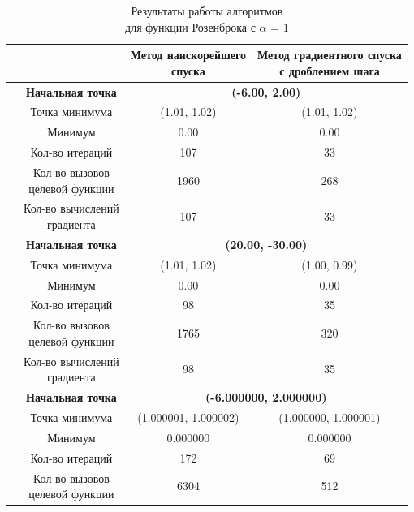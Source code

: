 \begin{table}[H]
        \centering
        \vspace*{-1.5em}
        \caption{Результаты работы алгоритмов\\для функции Розенброка с $\alpha$ = 1}
        \footnotesize
        \begin{tabular}{|c|c|c|c|}
        \hline
        & &\makecell{Метод наискорейшего\\спуска} &\makecell{Метод градиентного спуска\\с дроблением шага} \\
        \hline
	\multirow{10}{*}{\rotatebox[origin=c]{90}{$\varepsilon = 0.01$}}&\textbf{Начальная точка} &\multicolumn{2}{c|}{\textbf{(-6.00, 2.00)}}\\
	\cline{2-4}
	&Точка минимума &(1.01, 1.02) &(1.01, 1.02) \\ 
	\cline{2-4}
	&Минимум &0.00 &0.00 \\ 
	\cline{2-4}
	&Кол-во итераций &107 &33 \\ 
	\cline{2-4}
	&\makecell{Кол-во вызовов\\целевой функции} &1960 &268 \\ 
	\cline{2-4}
	&\makecell{Кол-во вычислений\\градиента} &107 &33 \\ 
	\cline{2-4}
\cline{2-4}&\textbf{Начальная точка} &\multicolumn{2}{c|}{\textbf{(20.00, -30.00)}}\\
	\cline{2-4}
	&Точка минимума &(1.01, 1.02) &(1.00, 0.99) \\ 
	\cline{2-4}
	&Минимум &0.00 &0.00 \\ 
	\cline{2-4}
	&Кол-во итераций &98 &35 \\ 
	\cline{2-4}
	&\makecell{Кол-во вызовов\\целевой функции} &1765 &320 \\ 
	\cline{2-4}
	&\makecell{Кол-во вычислений\\градиента} &98 &35 \\ 
	\cline{2-4}
	\hline
	\multirow{10}{*}{\rotatebox[origin=c]{90}{$\varepsilon = 1e-06$}}&\textbf{Начальная точка} &\multicolumn{2}{c|}{\textbf{(-6.000000, 2.000000)}}\\
	\cline{2-4}
	&Точка минимума &(1.000001, 1.000002) &(1.000000, 1.000001) \\ 
	\cline{2-4}
	&Минимум &0.000000 &0.000000 \\ 
	\cline{2-4}
	&Кол-во итераций &172 &69 \\ 
	\cline{2-4}
	&\makecell{Кол-во вызовов\\целевой функции} &6304 &512 \\ 

\end{tabular}
\end{table}
